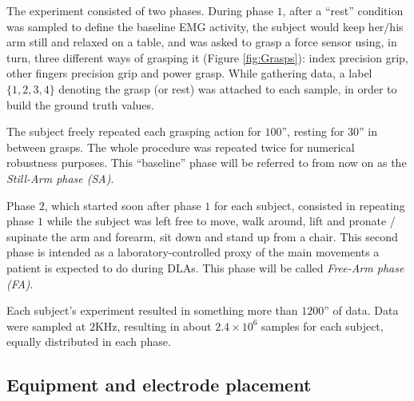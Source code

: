 \documentclass[10pt]{bmc_article}
\def\texttt{[image: ]}
\newenvironment{bmcformat}{\begin{raggedright}\baselineskip20pt\sloppy\setboolean{publ}{false}}{\end{raggedright}\baselineskip20pt\sloppy}
\begin{document}
\begin{bmcformat}
The experiment consisted of two phases.
During phase $1$, after a ``rest'' condition was sampled to define the baseline
EMG activity, the subject would keep her/his arm still and relaxed
on a table, and was asked to grasp a force sensor using, in turn,
three different ways of grasping it (Figure \ref{fig:Grasps}):
index precision grip, other fingers precision grip and power grasp.
While gathering data, a label $\{1,2,3,4\}$ denoting the grasp (or rest)
was attached to each sample, in order to build the ground truth values.


The subject freely repeated each grasping action for
$100$'', resting for $30$'' in between grasps. The whole procedure was
repeated twice for numerical robustness purposes. This ``baseline''
phase will be referred to from now on as the \emph{Still-Arm phase (SA)}.

Phase $2$, which started soon after phase $1$ for each subject,
consisted in repeating phase $1$ while the subject was left free to
move, walk around, lift and pronate / supinate the
arm and forearm, sit down and stand up from a chair. This 
second phase is intended as a laboratory-controlled proxy 
of the main movements a patient is expected to do during DLAs.
This phase will be called \emph{Free-Arm phase (FA)}.

Each subject's experiment resulted in something more than
$1200$'' of data. Data were sampled at $2$KHz, resulting in
about $2.4\times 10^6$ samples for each subject, equally
distributed in each phase.

\subsection*{Equipment and electrode placement}


\end{bmcformat}
\end{document}
